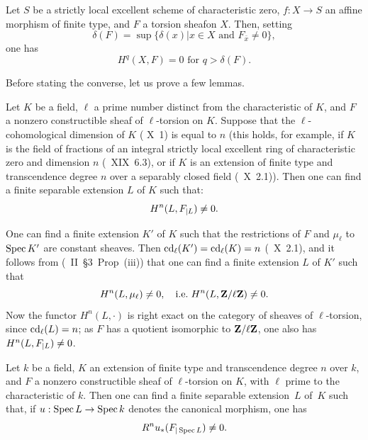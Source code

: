 Let $S$ be a strictly local excellent scheme of characteristic zero, $f:X\to S$ an affine morphism of finite type, and $F$ a torsion sheaf\pageoriginale on $X$. Then, setting
$$
\delta(F)=\sup\{\delta(x)|x\in X \text{ and } F_{\bar{x}} \neq 0\},
$$
one has
$$
H^q(X, F)=0 \text{ for } q>\delta(F).
$$

Before stating the converse, let us prove a few lemmas.

\begin{lemme} \label{XIV.3.2} Let $K$ be a field, $\ell$ a prime number distinct from the characteristic of $K$, and $F$ a nonzero constructible sheaf of $\ell$-torsion on $K$. Suppose that the $\ell$-cohomological dimension of $K$ (\textup{ X~1}) is equal to $n$ (this holds, for example, if $K$ is the field of fractions of an integral strictly local excellent ring of characteristic zero and dimension $n$ (\textup{~XIX~6.3}), or if $K$ is an extension of finite type and transcendence degree $n$ over a separably closed field (\textup{~X~2.1})). Then one can find a finite separable extension $L$ of $K$ such that:
$$H^n(L, \sisi{F{|L}}{F_{|L}}) \neq 0.
$$
\end{lemme}

One can find a finite extension $K'$ of $K$ such that the restrictions of $F$ and $\mu_\ell$ to $\Spec K'$ are constant sheaves. Then $\cd_{\ell}(K') = \cd_{\ell}(K) = n$ (~X~2.1), and it follows from (\cite{XIV.2}~II~\S 3~Prop~\textup{(iii)}) that one can find a finite extension $L$ of $K'$ such that\pageoriginale
$$
H^n(L, \mu_{\ell})\neq 0, \quad\text {\ie } H^n(L, \ZZ/\ell\ZZ) \neq 0.
$$
Now the functor $H^n(L,\cdot)$ is right exact on the category of sheaves of $\ell$-torsion, since $\cd_{\ell}(L)=n$; as $F$ has a quotient isomorphic to $\ZZ/\ell\ZZ$, one also has $H^n(L, \sisi{F{|L}}{F_{|L}}) \neq 0$.

\begin{corollaire} \label{XIV.3.3}
Let $k$ be a field, $K$ an extension of finite type and transcendence degree $n$ over $k$, and $F$ a nonzero constructible sheaf of $\ell$-torsion on $K$, with $\ell$ prime to the characteristic of $k$. Then one can find a finite separable extension~$L$ of~$K$ such that, if $u: \Spec L \to \Spec k$ denotes the canonical morphism, one has
$$R^n u_*(\sisi{F{|\Spec L}}{F_{|\Spec L}}) \neq 0.
$$
\end{corollaire}

